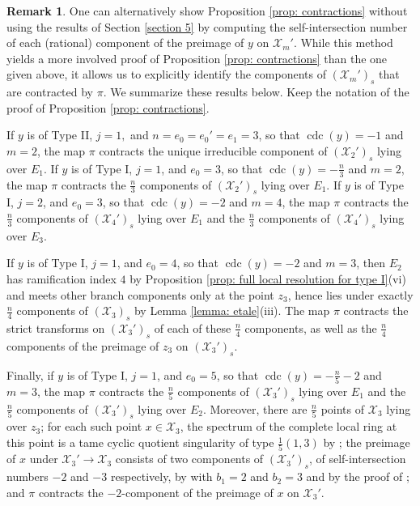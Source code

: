 \documentclass[12pt]{amsart}
\numberwithin{equation}{section}
\theoremstyle{definition}
\newtheorem{remark}[equation]{Remark}
\newcommand{\X}{\mathcal{X}}
\DeclareMathOperator{\cdc}{cdc}
\begin{document}
\begin{remark}
    One can alternatively show Proposition \ref{prop: contractions} without using the results of Section \ref{section 5} by computing the self-intersection number of each (rational) component of the preimage of $y$ on $\X_m'$. While this method yields a more involved proof of Proposition \ref{prop: contractions} than the one given above, it allows us to explicitly identify the components of $(\X_m')_s$ that are contracted by $\pi$. We summarize these results below. Keep the notation of the proof of Proposition \ref{prop: contractions}.
    
    If $y$ is of Type II, $j=1,$ and $n=e_0=e_0'=e_1=3$, so that $\cdc(y)=-1$ and $m=2$, the map $\pi$ contracts the unique irreducible component of $(\X_2')_s$ lying over $E_1$. If $y$ is of Type I, $j=1$, and $e_0=3$, so that $\cdc(y)=-\frac{n}{3}$ and $m=2$, the map $\pi$ contracts the $\frac{n}{3}$ components of $(\X_2')_s$ lying over $E_1$. If $y$ is of Type I, $j=2$, and $e_0=3$, so that $\cdc(y)=-2$ and $m=4$, the map $\pi$ contracts the $\frac{n}{3}$ components of $(\X_4')_s$ lying over $E_1$ and the $\frac{n}{3}$ components of $(\X_4')_s$ lying over $E_3$.
    
    If $y$ is of Type I, $j=1$, and $e_0=4$, so that $\cdc(y)=-2$ and $m=3$, then $E_2$ has ramification index $4$ by Proposition \ref{prop: full local resolution for type I}(vi) and meets other branch components only at the point $z_3$, hence lies under exactly $\frac{n}{4}$ components of $(\X_3)_s$ by Lemma \ref{lemma: etale}(iii). The map $\pi$ contracts the strict transforms on $(\X_3')_s$ of each of these $\frac{n}{4}$ components, as well as the $\frac{n}{4}$ components of the preimage of $z_3$ on $(\X_3')_s$.

    Finally, if $y$ is of Type I, $j=1$, and $e_0=5$, so that $\cdc(y)=-\frac{n}{5}-2$ and $m=3$, the map $\pi$ contracts the $\frac{n}{5}$ components of $(\X_3')_s$ lying over $E_1$ and the $\frac{n}{5}$ components of $(\X_3')_s$ lying over $E_2$. Moreover, there are $\frac{n}{5}$ points of $\X_3$ lying over $z_3$; for each such point $x\in\X_3$, the spectrum of the complete local ring at this point is a tame cyclic quotient singularity of type $\frac{1}{5}(1,3)$ by \cite[Proposition 7.6(iii)]{Part1}; the preimage of $x$ under $\X_3'\to\X_3$ consists of two components of $(\X_3')_s$, of self-intersection numbers $-2$ and $-3$ respectively, by \cite[Proposition 7.4]{Part1} with $b_1=2$ and $b_2=3$ and by the proof of \cite[Lemma 3.5]{ObusWewers}; and $\pi$ contracts the $-2$-component of the preimage of $x$ on $\X_3'$.
\end{remark}
\end{document}

